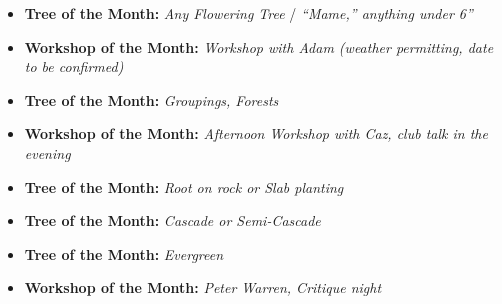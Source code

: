 \label{2025-04-calendar}

{}
\begin{itemize}
    \item \textbf{Tree of the Month:} \textit{Any Flowering Tree} / \textit{``Mame,'' anything under 6''}
    \item \textbf{Workshop of the Month:} \textit{Workshop with Adam (weather permitting, date to be confirmed)}
\end{itemize}

\medskip
{}
\begin{itemize}
    \item \textbf{Tree of the Month:} \textit{Groupings, Forests}
    \item \textbf{Workshop of the Month:} \textit{Afternoon Workshop with \textit{Caz}, club talk in the evening}
\end{itemize}

\medskip
{}
\begin{itemize}
    \item \textbf{Tree of the Month:} \textit{Root on rock or Slab planting}
\end{itemize}

\medskip
{}
\begin{itemize}
    \item \textbf{Tree of the Month:} \textit{Cascade or Semi-Cascade}
\end{itemize}

\medskip
{}
\begin{itemize}
    \item \textbf{Tree of the Month:} \textit{Evergreen}
    \item \textbf{Workshop of the Month:} \textit{\textit{Peter Warren,} Critique night}
\end{itemize}

